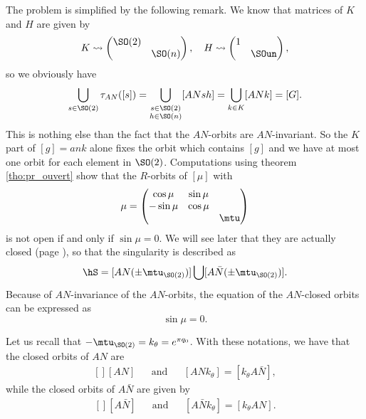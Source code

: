 The problem is simplified by the following remark.  We know that matrices of $K$ and $H$ are given by
\begin{equation}	\label{eq:K_H_SO}
  K\leadsto \begin{pmatrix}
                \SO(2)&   \\
		      & \SO(n)
            \end{pmatrix},\quad
  H\leadsto \begin{pmatrix}
                    1 & \\
		     & \SOun
            \end{pmatrix},
\end{equation}
so we obviously have
\[
\bigcup_{s\in \SO(2)} \tau_{AN}([s]) =\bigcup_{\substack { s\in \SO(2)\\ h\in \SO(n)}}[ANsh] =\bigcup_{k\in K} [ANk] =[G].
\]
This is nothing else than the fact that the $AN$-orbits are $AN$-invariant.
So the $K$ part of $[g]=ank$ alone fixes the orbit which contains $[g]$ and we have at most one orbit for each element in $\SO(2)$. Computations using theorem \ref{tho:pr_ouvert} show that the $R$-orbits of $[\mu]$ with
\[
\mu=
\begin{pmatrix}
\cos\mu &\sin\mu\\
-\sin\mu&\cos\mu\\
&&\mtu
\end{pmatrix}
\]
is not open if and only if $\sin \mu=0$. We will see later that they are actually closed (page \pageref{PgTopoOrb}), so that the singularity is described as
\begin{equation}\label{Sing2}
\hS=[AN(\pm\mtu_{\SO(2)})]\bigcup[A \bar{N}(\pm\mtu_{\SO(2)})].
\end{equation}
 Because of $AN$-invariance of the $AN$-orbits, the equation of the $AN$-closed orbits can be expressed as
\begin{equation}
\sin \mu=0.
\end{equation}

Let us recall that $-\mtu_{\SO(2)}=k_{\theta}= e^{\pi q_0}$. With these notations, we have that the closed orbits of $AN$ are
\begin{equation}
	\begin{aligned}[]
		[AN]&&\text{and}&&[ANk_{\theta}]=[k_{\theta}A\bar N],
	\end{aligned}
\end{equation}
while the closed orbits of $A\bar N$ are given by
\begin{equation}
	\begin{aligned}[]
		[A\bar N]&&\text{and}&&[A\bar Nk_{\theta}]=[k_{\theta}AN].
	\end{aligned}
\end{equation}

